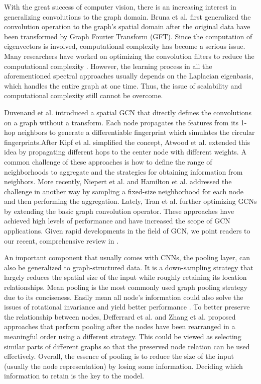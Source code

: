 \documentclass[conference]{IEEEtran}
\begin{document}
        With the great success of computer vision, there is an increasing interest in generalizing convolutions to the graph domain. Bruna et al.\cite{bruna2013spectral} first generalized the convolution operation to the graph's spatial domain after the original data have been transformed by Graph Fourier Transform (GFT). Since the computation of eigenvectors is involved, computational complexity has become a serious issue. Many researchers have worked on optimizing the convolution filters to reduce the computational complexity \cite{henaff2015deep,defferrard2016convolutional,li2018adaptive,levie2017cayleynets}. However, the learning process in all the aforementioned spectral approaches usually depends on the Laplacian eigenbasis, which handles the entire graph at one time. Thus, the issue of scalability and computational complexity still cannot be overcome.
        
        Duvenaud et al.\cite{duvenaud2015convolutional} introduced a spatial GCN that directly defines the convolutions on a graph without a transform. Each node propagates the features from its 1-hop neighbors to generate a differentiable fingerprint which simulates the circular fingerprints.After Kipf et al.\cite{kipf2016semi} simplified the concept, Atwood et al.\cite{atwood2016diffusion} extended this idea by propagating  different hops to the center node with different weights. A common challenge of these approaches is how to define the range of neighborhoods to aggregate and the strategies for obtaining information from neighbors. More recently, Niepert et al. \cite{niepert2016learning} and Hamilton et al. \cite{hamilton2017inductive} addressed the challenge in another way by sampling a fixed-size neighborhood for each node and then performing the aggregation. Lately, Tran et al. \cite{van2018filter} further optimizing GCNs by extending the basic graph convolution operator. These approaches have achieved high levels of performance and have increased the scope of GCN applications. Given rapid developments in the field of GCN, we point readers to our recent, comprehensive review in  \cite{wu2019comprehensive}.
        
        An important component that usually comes with CNNs, the pooling layer, can also be generalized to graph-structured data. It is a down-sampling strategy that largely reduces the spatial size of the input while roughly retaining its location relationships. Mean pooling is the most commonly used graph pooling strategy due to its conciseness. Easily mean all node's information could also solve the issues of rotational invariance and yield better performance \cite{henaff2015deep}. To better preserve the relationship between nodes, Defferrard et al. \cite{defferrard2016convolutional} and Zhang et al. \cite{zhang2018end} proposed approaches that perform pooling after the nodes have been rearranged in a meaningful order using a different strategy. This could be viewed as selecting similar parts of different graphs so that the preserved node relation can be used effectively. Overall, the essence of pooling is to reduce the size of the input (usually the node representation) by losing some information. Deciding which information to retain is the key to the model. 
        
\end{document}
